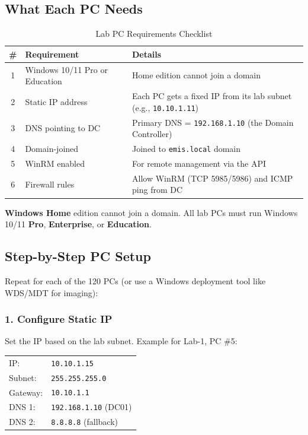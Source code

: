 ﻿\documentclass[12pt,a4paper]{article}
\begin{document}
\subsection{What Each PC Needs}

\begin{table}[H]
\centering
\begin{tabularx}{\textwidth}{c l X}
\toprule
\textbf{\#} & \textbf{Requirement} & \textbf{Details} \\
\midrule
1 & Windows 10/11 Pro or Education & Home edition cannot join a domain \\
2 & Static IP address & Each PC gets a fixed IP from its lab subnet (e.g., \texttt{10.10.1.11}) \\
3 & DNS pointing to DC & Primary DNS = \texttt{192.168.1.10} (the Domain Controller) \\
4 & Domain-joined & Joined to \texttt{emis.local} domain \\
5 & WinRM enabled & For remote management via the API \\
6 & Firewall rules & Allow WinRM (TCP 5985/5986) and ICMP ping from DC \\
\bottomrule
\end{tabularx}
\caption{Lab PC Requirements Checklist}
\end{table}

\begin{warningbox}
\textbf{Windows Home} edition cannot join a domain. All lab PCs must run Windows 10/11 \textbf{Pro}, \textbf{Enterprise}, or \textbf{Education}.
\end{warningbox}

\subsection{Step-by-Step PC Setup}

Repeat for each of the 120 PCs (or use a Windows deployment tool like WDS/MDT for imaging):

\subsubsection{1. Configure Static IP}

Set the IP based on the lab subnet. Example for Lab-1, PC \#5:

\begin{cmdbox}
\begin{tabular}{ll}
IP:      & \texttt{10.10.1.15} \\
Subnet:  & \texttt{255.255.255.0} \\
Gateway: & \texttt{10.10.1.1} \\
DNS 1:   & \texttt{192.168.1.10} (DC01) \\
DNS 2:   & \texttt{8.8.8.8} (fallback) \\
\end{tabular}
\end{cmdbox}
\end{document}
